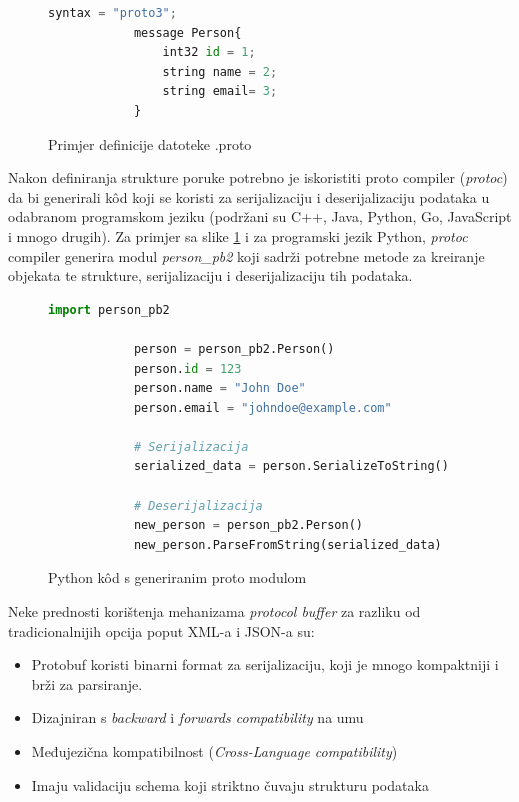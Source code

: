 \documentclass[zavrsnirad]{fer}
\begin{document}
\begin{figure}[H]
	\centering
	\begin{minipage}{0.6\linewidth}
		\begin{lstlisting}[language=Python]
			syntax = "proto3";
			message Person{
				int32 id = 1;
				string name = 2;
				string email= 3;
			}
		\end{lstlisting}
	\end{minipage}
	\caption{Primjer definicije datoteke .proto}
	\label{slk:proto}
\end{figure}
\newpage		
	Nakon definiranja strukture poruke potrebno je iskoristiti proto compiler (\textit{protoc}) da bi generirali k\^od koji se koristi za serijalizaciju i deserijalizaciju podataka u odabranom programskom jeziku (podržani su C++, Java, Python, Go, JavaScript i mnogo drugih). Za primjer sa slike \ref{slk:proto} i za programski jezik Python, \textit{protoc} compiler generira modul \textit{person\_pb2} koji sadrži potrebne metode za kreiranje objekata te strukture, serijalizaciju i deserijalizaciju tih podataka. 

\begin{figure}[H]
	\centering
	\begin{minipage}{0.8\linewidth}
		\begin{lstlisting}[language=Python]
			import person_pb2
			
			person = person_pb2.Person()
			person.id = 123
			person.name = "John Doe"
			person.email = "johndoe@example.com"
			
			# Serijalizacija
			serialized_data = person.SerializeToString()
			
			# Deserijalizacija
			new_person = person_pb2.Person()
			new_person.ParseFromString(serialized_data)
		\end{lstlisting}
	\end{minipage}
	\caption{Python k\^od s generiranim proto modulom}
	\label{slk:proto_kod}
\end{figure}

Neke prednosti korištenja mehanizama \textit{protocol buffer} za razliku od tradicionalnijih opcija poput XML-a i JSON-a su:

\begin{itemize}
	\item Protobuf koristi binarni format za serijalizaciju, koji je mnogo kompaktniji i brži za parsiranje.
	\item Dizajniran s \textit{backward} i \textit{forwards compatibility} na umu 
	\item Međujezična kompatibilnost (\textit{Cross-Language compatibility})
	\item Imaju validaciju schema koji striktno čuvaju strukturu podataka
\end{itemize}
\end{document}
